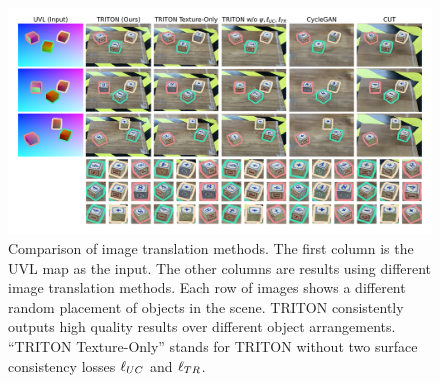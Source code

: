 \documentclass{article}
\begin{document}


\begin{figure}[th]
	\begin{center}
		\includegraphics[width=.9\textwidth]{../images/frame_inconsistency_diagram.png}
	\end{center}
	\vspace{-7pt}
	\caption{
	    Comparison of image translation methods.
	    The first column is the UVL map as the input.
	    The other columns are results using different image translation methods.
		Each row of images shows a different random placement of objects in the scene.
		TRITON consistently outputs high quality results over different object arrangements. 
		``TRITON Texture-Only'' stands for TRITON without two surface consistency losses $\ell_{UC}$ and $\ell_{TR}$.
		}
		\vspace{-15pt}
		\label{fig:frame_inconsistency_diagram}
	\end{figure}
	
\end{document}
